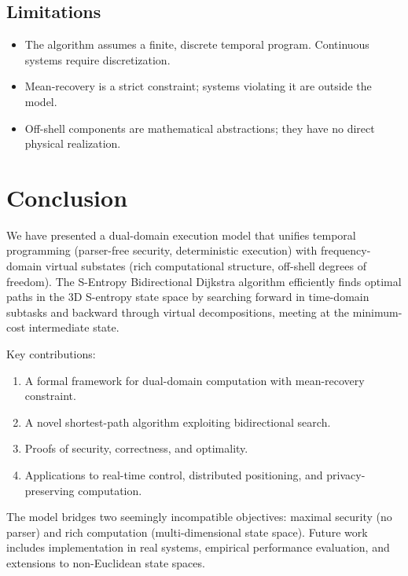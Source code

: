 \documentclass[twocolumn,11pt,a4paper]{article}
\begin{document}
\subsection{Limitations}

\begin{itemize}[nosep,leftmargin=1em]
  \item The algorithm assumes a finite, discrete temporal program. Continuous systems require discretization.
  \item Mean-recovery is a strict constraint; systems violating it are outside the model.
  \item Off-shell components are mathematical abstractions; they have no direct physical realization.
\end{itemize}

\section{Conclusion}
\label{sec:conclusion}

We have presented a dual-domain execution model that unifies temporal programming (parser-free security, deterministic execution) with frequency-domain virtual substates (rich computational structure, off-shell degrees of freedom). The S-Entropy Bidirectional Dijkstra algorithm efficiently finds optimal paths in the 3D S-entropy state space by searching forward in time-domain subtasks and backward through virtual decompositions, meeting at the minimum-cost intermediate state.

Key contributions:
\begin{enumerate}[nosep]
  \item A formal framework for dual-domain computation with mean-recovery constraint.
  \item A novel shortest-path algorithm exploiting bidirectional search.
  \item Proofs of security, correctness, and optimality.
  \item Applications to real-time control, distributed positioning, and privacy-preserving computation.
\end{enumerate}

The model bridges two seemingly incompatible objectives: maximal security (no parser) and rich computation (multi-dimensional state space). Future work includes implementation in real systems, empirical performance evaluation, and extensions to non-Euclidean state spaces.
\end{document}
